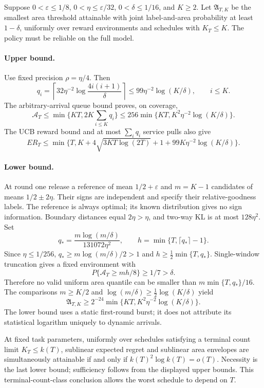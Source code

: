 Suppose $0<\varepsilon\le1/8$, $0<\eta\le\varepsilon/32$,
$0<\delta\le1/16$, and $K\ge2$. Let $\mathfrak A_{T,K}$ be the smallest
area threshold attainable with joint label-and-area probability at least
$1-\delta$, uniformly over reward environments and schedules with $K_T\le K$.
The policy must be reliable on the full model.

\paragraph{Upper bound.}
Use fixed precision $\rho=\eta/4$. Then
\[
 q_i=\left\lceil32\eta^{-2}\log\frac{4i(i+1)}\delta\right\rceil
 \le99\eta^{-2}\log(K/\delta),\qquad i\le K.
\]
The arbitrary-arrival queue bound proves, on coverage,
\[
 \mathcal A_T\le\min\{KT,2K\sum_{i\le K}q_i\}
 \le256\min\{KT,K^2\eta^{-2}\log(K/\delta)\}.
\]
The UCB reward bound and at most $\sum_iq_i$ service pulls also give
\[
 ER_T\le\min\{T,K+4\sqrt{3KT\log(2T)}+1+
                  99K\eta^{-2}\log(K/\delta)\}.
\]

\paragraph{Lower bound.}
At round one release a reference of mean $1/2+\varepsilon$ and
$m=K-1$ candidates of means $1/2\pm2\eta$. Their signs are independent and
specify their relative-goodness labels. The reference is always optimal;
its known distribution gives no sign information. Boundary distances equal
$2\eta>\eta$, and two-way KL is at most $128\eta^2$. Set
\[
 q_* =\frac{m\log(m/\delta)}{131072\eta^2},\qquad
 h=\min\{T,\lceil q_*\rceil-1\}.
\]
Since $\eta\le1/256$, $q_*\ge m\log(m/\delta)/2>1$ and
$h\ge\frac12\min\{T,q_*\}$. Single-window truncation gives a fixed
environment with
\[
 P\{\mathcal A_T\ge mh/8\}\ge1/7>\delta.
\]
Therefore no valid uniform area quantile can be smaller than
$m\min\{T,q_*\}/16$. The comparisons
$m\ge K/2$ and $\log(m/\delta)\ge\frac12\log(K/\delta)$ yield
\[
 \mathfrak A_{T,K}\ge
 2^{-24}\min\{KT,K^2\eta^{-2}\log(K/\delta)\}.
\]
The lower bound uses a static first-round burst; it does not attribute its
statistical logarithm uniquely to dynamic arrivals.

At fixed task parameters, uniformly over schedules satisfying a terminal
count limit $K_T\le k(T)$, sublinear expected regret and sublinear area
envelopes are simultaneously attainable if and only if
$k(T)^2\log k(T)=o(T)$. Necessity is the last lower bound; sufficiency follows
from the displayed upper bounds. This terminal-count-class conclusion
allows the worst schedule to depend on $T$.

